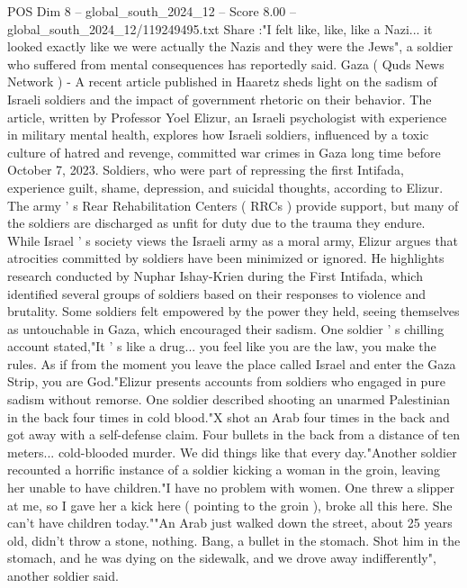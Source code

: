 \begin{textsample}{POS Dim 8 – global\_south\_2024\_12 – Score 8.00 – global\_south\_2024\_12/119249495.txt}  \label{ex:f8_pos_070}
Share :"I felt like, like, like a Nazi... it looked exactly like we were actually the Nazis and they were the Jews", a soldier who suffered from mental consequences has reportedly said.
Gaza ( Quds News Network ) - A recent article published in Haaretz sheds light on the sadism of Israeli soldiers and the impact of government rhetoric on their behavior.
The article, written by Professor Yoel Elizur, an Israeli psychologist with experience in military mental health, explores how Israeli soldiers, influenced by a toxic culture of hatred and revenge, committed war crimes in Gaza long time before October 7, 2023.
Soldiers, who were part of repressing the first Intifada, experience guilt, shame, depression, and suicidal thoughts, according to Elizur.
The army ' s Rear Rehabilitation Centers ( RRCs ) provide support, but many of the soldiers are discharged as unfit for duty due to the trauma they endure.
While Israel ' s society views the Israeli army as a moral army, Elizur argues that atrocities committed by soldiers have been minimized or ignored.
He highlights research conducted by Nuphar Ishay-Krien during the First Intifada, which identified several groups of soldiers based on their responses to violence and brutality.
Some soldiers felt empowered by the power they held, seeing themselves as untouchable in Gaza, which encouraged their sadism.
One soldier ' s chilling account stated,"It ' s like a drug... you feel like you are the law, you make the rules.
As if from the moment you leave the place called Israel and enter the Gaza Strip, you are God."Elizur presents accounts from soldiers who engaged in pure sadism without remorse.
One soldier described shooting an unarmed Palestinian in the back four times in cold blood."X shot an Arab four times in the back and got away with a self-defense claim.
Four bullets in the back from a distance of ten meters... cold-blooded murder.
We did things like that every day."Another soldier recounted a horrific instance of a soldier kicking a woman in the groin, leaving her unable to have children."I have no problem with women.
One threw a slipper at me, so I gave her a kick here ( pointing to the groin ), broke all this here.
She can't have children today.""An Arab just walked down the street, about 25 years old, didn't throw a stone, nothing.
Bang, a bullet in the stomach.
Shot him in the stomach, and he was dying on the sidewalk, and we drove away indifferently", another soldier said.

\end{textsample}
